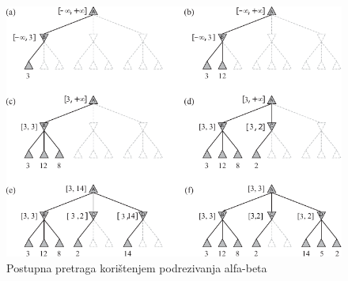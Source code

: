 \documentclass[times, utf8, seminar, numeric, tikz]{fer}
\begin{document}
\begin{figure}[h]
	\centering
	\includegraphics[width=1.0\linewidth]{Images/alphaBetaIspravak}
	\caption{Postupna pretraga korištenjem podrezivanja alfa-beta\cite{s.russellp.norvig2009}}
	\label{fig:alphaBetaExample}
\end{figure}
\end{document}
